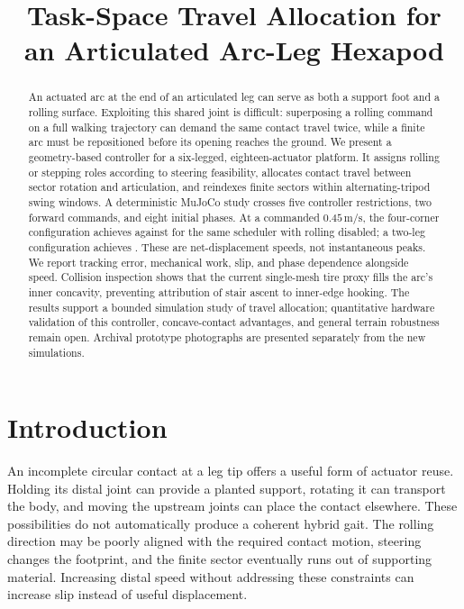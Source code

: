 \documentclass[letterpaper,10pt,conference]{ieeeconf}
\title{\LARGE\bf Task-Space Travel Allocation for an Articulated Arc-Leg Hexapod}
\author{\mbox{}}
\begin{document}
\maketitle
\thispagestyle{empty}\pagestyle{empty}
\begin{abstract}
An actuated arc at the end of an articulated leg can serve as both a support foot and a rolling surface. Exploiting this shared joint is difficult: superposing a rolling command on a full walking trajectory can demand the same contact travel twice, while a finite arc must be repositioned before its opening reaches the ground. We present a geometry-based controller for a six-legged, eighteen-actuator platform. It assigns rolling or stepping roles according to steering feasibility, allocates contact travel between sector rotation and articulation, and reindexes finite sectors within alternating-tripod swing windows. A deterministic MuJoCo study crosses five controller restrictions, two forward commands, and eight initial phases. At a commanded $0.45\,\mathrm{m/s}$, the four-corner configuration achieves \CornerSpeed{} against \NoRollSpeed{} for the same scheduler with rolling disabled; a two-leg configuration achieves \PairSpeed{}. These are net-displacement speeds, not instantaneous peaks. We report tracking error, mechanical work, slip, and phase dependence alongside speed. Collision inspection shows that the current single-mesh tire proxy fills the arc's inner concavity, preventing attribution of stair ascent to inner-edge hooking. The results support a bounded simulation study of travel allocation; quantitative hardware validation of this controller, concave-contact advantages, and general terrain robustness remain open. Archival prototype photographs are presented separately from the new simulations.
\end{abstract}

\section{Introduction}
An incomplete circular contact at a leg tip offers a useful form of actuator reuse. Holding its distal joint can provide a planted support, rotating it can transport the body, and moving the upstream joints can place the contact elsewhere. These possibilities do not automatically produce a coherent hybrid gait. The rolling direction may be poorly aligned with the required contact motion, steering changes the footprint, and the finite sector eventually runs out of supporting material. Increasing distal speed without addressing these constraints can increase slip instead of useful displacement.
\end{document}
